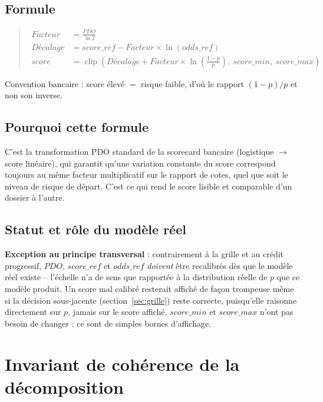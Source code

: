 \documentclass[11pt,a4paper]{article}
\newenvironment{formule}{\begin{quote}}{\end{quote}}
\begin{document}
\subsection*{Formule}
\begin{formule}
\begin{align}
\mathit{Facteur} &= \frac{\mathit{PDO}}{\ln 2} \\
\mathit{Décalage} &= \mathit{score\_ref} - \mathit{Facteur} \times \ln(\mathit{odds\_ref}) \\
\mathit{score} &= \operatorname{clip}\left(\mathit{Décalage} + \mathit{Facteur} \times \ln\!\left(\frac{1-p}{p}\right),\ \mathit{score\_min},\ \mathit{score\_max}\right)
\end{align}
\end{formule}

Convention bancaire : score élevé $=$ risque faible, d'où le rapport $(1-p)/p$ et non son inverse.

\subsection*{Pourquoi cette formule}
C'est la transformation PDO standard de la scorecard bancaire (logistique $\to$ score linéaire),
qui garantit qu'une variation constante du score correspond toujours au même facteur
multiplicatif sur le rapport de cotes, quel que soit le niveau de risque de départ. C'est ce qui
rend le score lisible et comparable d'un dossier à l'autre.

\subsection*{Statut et rôle du modèle réel}
\textbf{Exception au principe transversal} : contrairement à la grille et au crédit progressif,
$\mathit{PDO}$, $\mathit{score\_ref}$ et $\mathit{odds\_ref}$ \emph{doivent} être recalibrés dès
que le modèle réel existe -- l'échelle n'a de sens que rapportée à la distribution réelle de $p$
que ce modèle produit. Un score mal calibré resterait affiché de façon trompeuse même si la
décision sous-jacente (section~\ref{sec:grille}) reste correcte, puisqu'elle raisonne directement
sur $p$, jamais sur le score affiché. $\mathit{score\_min}$ et $\mathit{score\_max}$ n'ont pas
besoin de changer : ce sont de simples bornes d'affichage.

\newpage

\section{Invariant de cohérence de la décomposition}
\label{sec:invariant}
\end{document}
